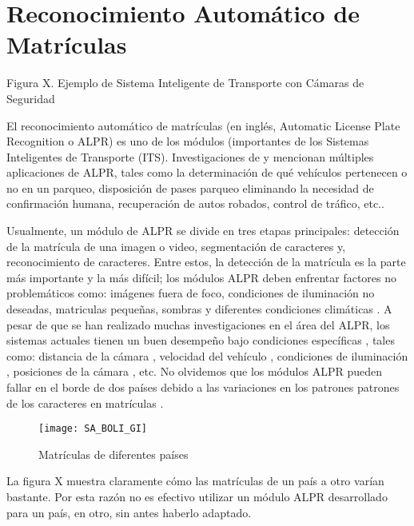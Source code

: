\chapter{Reconocimiento Automático de Matrículas}
Figura X. Ejemplo de Sistema Inteligente de Transporte con Cámaras de Seguridad \parencite{TechFAQ2016-oi}

El reconocimiento automático de matrículas (en inglés, Automatic License Plate Recognition o ALPR) es uno de los módulos (importantes de los Sistemas Inteligentes de Transporte (ITS). Investigaciones de \parencite{Anagnostopoulos2008-uh} y \parencite{TechTarget2016-gw} mencionan múltiples aplicaciones de ALPR, tales como la determinación de qué vehículos pertenecen o no en un parqueo, disposición de pases parqueo eliminando la necesidad de confirmación humana, recuperación de autos robados, control de tráfico, etc..

Usualmente, un módulo de ALPR se divide en tres etapas principales: detección de la matrícula de una imagen o video, segmentación de caracteres y, reconocimiento de caracteres. Entre estos, la detección de la matrícula es la parte más importante y la más difícil; los módulos ALPR deben enfrentar factores no problemáticos como: imágenes fuera de foco, condiciones de iluminación no deseadas, matriculas pequeñas, sombras y diferentes condiciones climáticas \parencite{Mahini2006-us}.
A pesar de que se han realizado muchas investigaciones en el área del ALPR, los sistemas actuales tienen un buen desempeño bajo condiciones específicas \parencite{Anagnostopoulos2006-is}, tales como: distancia de la cámara \parencite{Martin2002-zu,Guo2008-qk}, velocidad del vehículo \parencite{Garibotto2001-lu}, condiciones de iluminación \parencite{Xiong2004-qv,Mahini2006-us}, posiciones de la cámara \parencite{Chang2004-kg}, etc. No olvidemos que los módulos ALPR pueden fallar en el borde de dos países debido a las variaciones en los patrones patrones de los caracteres en matrículas \parencite{Anagnostopoulos2006-is,Shapiro2006-rv,Mecocci2006-nt}.

  \begin{figure}[H]
        \centering
        \texttt{[image: SA\_BOLI\_GI]}
        \caption{ Matrículas de diferentes países \parencite{Kustermann2016-yd}}
        \label{fig:worldcarplates}
\end{figure}  

La figura X muestra claramente cómo las matrículas de un país a otro varían bastante. Por esta razón no es efectivo utilizar un módulo ALPR desarrollado para un país, en otro, sin antes haberlo adaptado.
